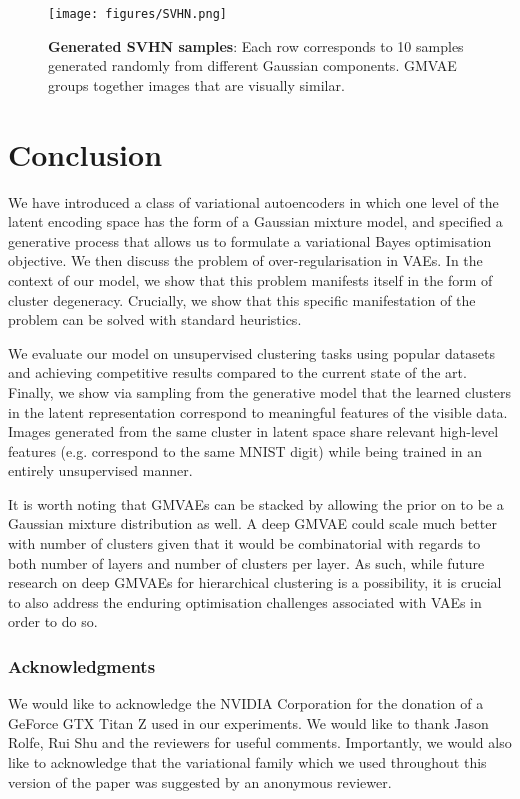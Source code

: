 \documentclass{article} \usepackage{iclr2017_conference,times}
\begin{document}
\begin{figure}[h]
\centering
\texttt{[image: figures/SVHN.png]}
 \caption{\textbf{Generated SVHN samples}: Each row corresponds to 10 samples generated randomly from different Gaussian components. GMVAE groups together images that are visually similar.}
\label{fig:SVHN}
\end{figure}

\section{Conclusion}

We have introduced a class of variational autoencoders in which one level of the latent encoding space has the form of a Gaussian mixture model, and specified a generative process that allows us to formulate a variational Bayes optimisation objective. We then discuss the problem of over-regularisation in VAEs. In the context of our model, we show that this problem manifests itself in the form of cluster degeneracy. Crucially, we show that this specific manifestation of the problem can be solved with standard heuristics. 

We evaluate our model on unsupervised clustering tasks using popular datasets and achieving competitive results compared to the current state of the art. Finally, we show via sampling from the generative model that the learned clusters in the latent representation correspond to meaningful features of the visible data. Images generated from the same cluster in latent space share relevant high-level features (e.g. correspond to the same MNIST digit) while being trained in an entirely unsupervised manner.

It is worth noting that GMVAEs can be stacked by allowing the prior on  to be a Gaussian mixture distribution as well. A deep GMVAE could scale much better with number of clusters given that it would be combinatorial with regards to both number of layers and number of clusters per layer. As such, while future research on deep GMVAEs for hierarchical clustering is a possibility, it is crucial to also address the enduring optimisation challenges associated with VAEs in order to do so.

\subsubsection*{Acknowledgments}
We would like to acknowledge the NVIDIA Corporation for the donation of a GeForce GTX Titan Z used in our experiments. We would like to thank Jason Rolfe, Rui Shu and the reviewers for useful comments. Importantly, we would also like to acknowledge that the variational family which we used throughout this version of the paper was suggested by an anonymous reviewer. 
\end{document}
